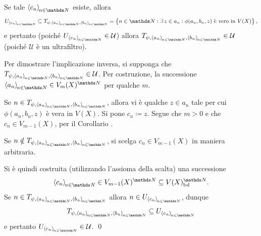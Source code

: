 {\begin{itemize}
        Se tale $ \sequence{c_{n} } $ esiste, allora \begin{equation*}
            U_{\sequence{c_{n} }} \subseteq T_{\psi, \sequence{a_{n}},\sequence{b_{n}}} = \set{n \in \N: \exists\, z \in a_{n}: \phi(a_{n}, b_{n}, z  ) \text{ è vero in }V(X)},   
        \end{equation*}e pertanto (poiché $ U_{\sequence{c_{n} }} \in \mathcal{U} $) allora $ T_{\psi, \sequence{a_{n}},\sequence{b_{n}}} \in \mathcal{U} $ (poiché $ \mathcal{U} $ è un ultrafiltro). 

        Per dimostrare l'implicazione inversa, si supponga che $ T_{\psi, \sequence{a_{n}},\sequence{b_{n}}} \in \mathcal{U} $. Per costruzione, la successione $ \sequence{a_{n} } \in V_{m}(X)^{\N}  $ per qualche $ m $. 
        
        Se $ n \in T_{\psi, \sequence{a_{n}},\sequence{b_{n}}} $, allora vi è qualche $ z \in a_{n}  $ tale per cui $ \phi(a_{n}, b_{n}, z) $ è vera in $ V(X) $. Si pone $ c_{n} \coloneqq z  $. Segue che $ m>0 $ e che $ c_{n} \in V_{m-1}(X)  $, per il Corollario . 

        Se $ n \notin T_{\psi, \sequence{a_{n}},\sequence{b_{n}}}$, si scelga $ c_{n} \in V_{m-1}(X) $ in maniera arbitraria. 

        Si è quindi costruita (utilizzando l'assioma della scalta) una successione \[\sequence{c_{n} } \in V_{m-1}(X)^{\N} \subseteq V(X)^{\N}_{\bounded}.\]Se $ n \in T_{\psi, \sequence{a_{n}},\sequence{b_{n}}} $ allora $ n \in U_{\sequence{c_{n}}}  $, dunque \begin{equation*}
            T_{\psi, \sequence{a_{n}},\sequence{b_{n}}} \subseteq U_{\sequence{c_{n}} } 
        \end{equation*}e pertanto $ U_{\sequence{c_{n} }} \in \mathcal{U} $.
    \qed\end{itemize}
}
